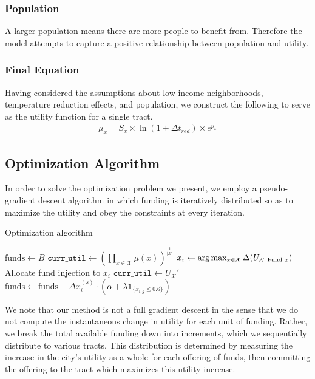 \documentclass[11pt]{article}
\begin{document}
\subsubsection{Population}
A larger population means there are more people to benefit from. Therefore the model attempts to capture a positive relationship between population and utility.

\subsubsection{Final Equation}
Having considered the assumptions about low-income neighborhoods, temperature reduction effects, and population, we construct the following to serve as the utility function for a single tract.
\begin{equation}
\begin{aligned}
\mu_x = S_x \times \ln(1+\Delta t_{red}) \times e^{p_x}
\end{aligned}
\end{equation}

\subsection{Optimization Algorithm}
In order to solve the optimization problem we present, we employ a pseudo-gradient descent algorithm in which funding is iteratively distributed so as to maximize the utility and obey the constraints at every iteration.
\begin{algorithm}[H]
\caption{Optimization algorithm}\label{alg:optim}
\begin{algorithmic}[1]
\State $\textrm{funds} \gets B$
    \State $\texttt{curr\_util} \gets (\prod_{x \in \mathcal{X}} \mu(x))^\frac{1}{|\mathcal{X}|}$
    \State $x_i \gets \arg \max_{x \in \mathcal{X}} \Delta (U_\mathcal{X} \large|_{\textrm{Fund }x})$
    \State Allocate fund injection to $x_i$ 
    \State $\texttt{curr\_util} \gets U_\mathcal{X}'$ 
    \State $\textrm{funds} \gets \textrm{funds} -\Delta x^{(s)}_i \cdot (\alpha + \lambda \mathds{1}_{\{x_{i, g} \leq 0.6\}})$
\EndWhile
\end{algorithmic}
\end{algorithm}
We note that our method is not a full gradient descent in the sense that we do not compute the instantaneous change in utility for each unit of funding. Rather, we break the total available funding down into increments, which we sequentially distribute to various tracts. This distribution is determined by measuring the increase in the city's utility as a whole for each offering of funds, then committing the offering to the tract which maximizes this utility increase.
\end{document}
